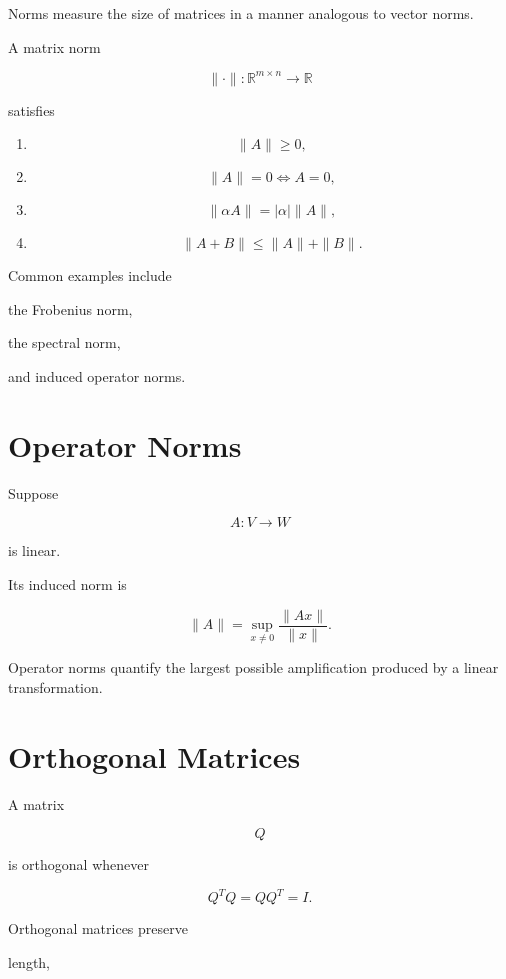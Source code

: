 \documentclass[11pt,fleqn]{book}
\numberwithin{equation}{chapter}
\theoremstyle{plain}
\theoremstyle{definition}
\theoremstyle{remark}
\begin{document}
Norms measure the size of matrices in a manner analogous to vector
norms.

A matrix norm

\[
\|\cdot\|
:
\mathbb R^{m\times n}
\rightarrow
\mathbb R
\]

satisfies

\begin{enumerate}
\item
\[
\|A\|\ge0,
\]

\item
\[
\|A\|=0
\Longleftrightarrow
A=0,
\]

\item
\[
\|\alpha A\|
=
|\alpha|
\|A\|,
\]

\item
\[
\|A+B\|
\le
\|A\|
+
\|B\|.
\]
\end{enumerate}

Common examples include

the Frobenius norm,

the spectral norm,

and induced operator norms.


\section{Operator Norms}

Suppose

\[
A:V\rightarrow W
\]

is linear.

Its induced norm is

\[
\boxed{
\|A\|
=
\sup_{x\neq0}
\frac{\|Ax\|}{\|x\|}.
}
\]

Operator norms quantify the largest possible amplification produced by
a linear transformation.


\section{Orthogonal Matrices}

A matrix

\[
Q
\]

is orthogonal whenever

\[
Q^TQ
=
QQ^T
=
I.
\]

Orthogonal matrices preserve

length,
\end{document}
